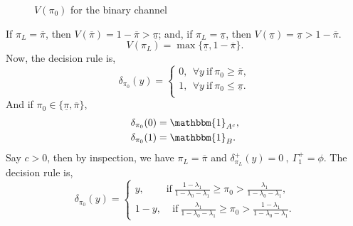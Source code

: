 \documentclass[a4paper,english,12pt]{article}
\begin{document}
\begin{exmp}
\begin{figure}[h!]
\caption{$V(\pi_0)$ for the binary channel}
\label{fig:binaryminimax}
\end{figure}
If $\pi_L=\overline{\pi}$, then $V(\overline{\pi})=1-\overline{\pi}>\underline{\pi}$; and, if $\pi_L=\underline{\pi}$, then $V(\underline{\pi})=\underline{\pi}>1-\overline{\pi}$.
\begin{equation}
 V(\pi_L)= \max{\{\underline{\pi},1-\overline{\pi}}\}.
\end{equation}
Now, the decision rule is,
\begin{equation}
\delta_{\pi_0}(y)=\begin{cases}0,~~\forall y ~\mbox{if}~ \pi_0\geq\overline{\pi},\\
				1,~~\forall y~ \mbox{if}~ \pi_0\leq\underline{\pi}.\\
				\end{cases}
\end{equation}
And if $\pi_0\in\{\underline{\pi},\overline{\pi}\}$,
\begin{align}
\delta_{\pi_0}(0)&=\mathbbm{1}_{A^{c}},\\\nonumber
\delta_{\pi_0}(1)&=\mathbbm{1}_{B}.
\end{align}
Say $c>0$, then by inspection, we have $\pi_L=\overline{\pi}$ and $\delta^{+}_{\pi_L}(y)=0~,~\Gamma_{1}^{+}=\phi$. The decision rule is,
\begin{equation}
\delta_{\pi_0}(y)= \begin{cases}
y, ~~~~~~~~~~\mbox{if} ~\frac{1-\lambda_1}{1-\lambda_0-\lambda_1}\geq\pi_0>\frac{\lambda_1}{1-\lambda_0-\lambda_1},\\
1-y, ~~~~~\mbox{if} ~\frac{\lambda_1}{1-\lambda_0-\lambda_1}\geq\pi_0>\frac{1-\lambda_1}{1-\lambda_0-\lambda_1}.
\end{cases}
\end{equation}
\end{exmp}
\end{document}

